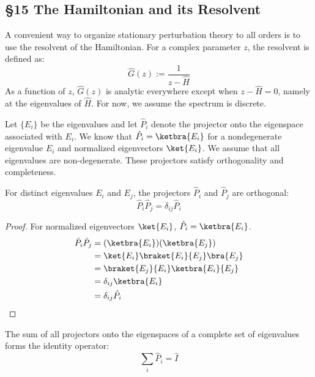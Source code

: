 \subsection{§15 The Hamiltonian and its Resolvent}
\begin{note}
  A convenient way to organize stationary perturbation theory to
  all orders is to use the resolvent of the Hamiltonian. For a
  complex parameter $z$, the resolvent is defined as:
  \begin{equation} \label{eq:resolvent_definition}
    \hat G(z):=\frac{1}{z-\hat H}
  \end{equation}
  As a function of $z$, $\hat G(z)$ is analytic everywhere except
  when $z - \hat H = 0$, namely at the eigenvalues of $\hat H$. For
  now, we assume the spectrum is discrete.
\end{note}

Let $\{E_i\}$ be the eigenvalues and let $\hat P_i$ denote the
projector onto the eigenspace associated with $E_i$. We know that
$\hat P_i = \ketbra{E_i}$ for a nondegenerate eigenvalue $E_i$ and
normalized eigenvectors $\ket{E_i}$. We assume that all eigenvalues
are non-degenerate. These projectors satisfy
orthogonality and completeness.

\begin{lemma}
  For distinct eigenvalues $E_i$ and $E_j$, the projectors $\hat
  P_i$ and $\hat P_j$ are orthogonal:
  \begin{equation} \label{eq:projector_orthogonality}
    \hat P_i \hat P_j= \delta_{ij} \hat P_i
  \end{equation}
\end{lemma}
\begin{proof}
  For normalized eigenvectors $\ket{E_i}$, $\hat P_i = \ketbra{E_i}$.
  \begin{align}
    \hat P_i \hat P_j &= (\ketbra {E_i})(\ketbra {E_j}) \\
    &= \ket{E_i} \braket{E_i} {E_j} \bra {E_j} \\
    &= \braket{E_j} {E_i} \ketbra {E_i} {E_j} \\
    &= \delta_{ij} \ketbra {E_i} \\
    &= \delta_{ij} \hat P_i
  \end{align}
\end{proof}

\begin{definition}
  The sum of all projectors onto the eigenspaces of a complete set
  of eigenvalues forms the identity operator:
  \begin{equation} \label{eq:completeness_relation}
    \sum_i \hat P_i = \hat I
  \end{equation}
\end{definition}

